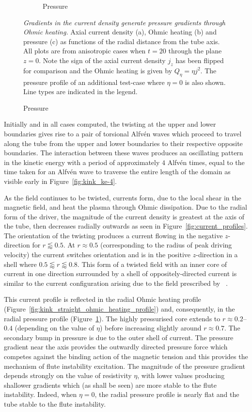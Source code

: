 \documentclass[fleqn,usenatbib]{mnras}
\newcommand{\revcite}[1]{{\color{red} \underline{#1}}}
\newcommand{\mycaption}[2]{\caption[#1]{\emph{#1} #2}}
\begin{document}
\begin{figure}
\begin{subfigure}{0.32\textwidth}
      \caption{Pressure}
      \label{fig:pressure_profiles}
    \end{subfigure}
  \mycaption{ Gradients in the current density generate pressure gradients
  through Ohmic heating.}{Axial current density (a), Ohmic heating (b) and
  pressure (c) as functions of the radial distance from the tube axis. All
  plots are from anisotropic cases when $t=20$ through the plane $z=0$. Note
  the sign of the axial current density $j_z$ has been flipped for comparison
  and the Ohmic heating is given by $Q_{\eta} = \eta j^2$. The pressure profile
  of an additional test-case where $\eta=0$ is also shown. Line types are
  indicated in the legend.}
  \label{fig:pressure_and_heating}
\end{figure}

Initially and in all cases computed, the twisting at the upper and lower
boundaries gives rise to a pair of torsional Alfv\'en waves which proceed to
travel along the tube from the upper and lower boundaries to their respective
opposite boundaries. The interaction between these waves produces an
oscillating pattern in the kinetic energy with a period of approximately $4$
Alfv\'en times, equal to the time taken for an Alfv\'en wave to traverse the
entire length of the domain as visible early in Figure~\ref{fig:kink_ke-4}. 

As the field continues to be twisted, currents form, due to the local shear in
the magnetic field, and heat the plasma through Ohmic dissipation. Due to the
radial form of the driver, the magnitude of the current density is greatest at
the axis of the tube, then decreases radially outwards as seen in
Figure~\ref{fig:current_profiles}. The orientation of the twisting produces
a current flowing in the negative $z$-direction for $r\lessapprox0.5$. At $r
\approx 0.5$ (corresponding to the radius of peak driving velocity) the current
switches orientation and is in the positive $z$-direction in a shell where
$0.5\lessapprox r \lessapprox 0.8$. This form of a twisted field with an inner
core of current in one direction surrounded by a shell of oppositely-directed
current is similar to the current configuration arising due to the field
prescribed by~\revcite{\citet{quinnEffectAnisotropicViscosity2020}}. 

This current profile is reflected in the radial Ohmic heating profile
(Figure~\ref{fig:kink_straight_ohmic_heating_profile}) and, consequently, in
the radial pressure profile (Figure~\ref{fig:pressure_profiles}). The highly
pressurised core extends to $r\approx 0.2$--$0.4$ (depending on the value of
$\eta$) before increasing slightly around $r\approx 0.7$. The secondary bump in
pressure is due to the outer shell of current. The pressure gradient near the
axis provides the outwardly directed pressure force which competes against the
binding action of the magnetic tension and this provides the mechanism of flute
instability excitation.  The magnitude of the pressure gradient depends
strongly on the value of resistivity $\eta$, with lower values producing
shallower gradients which (as shall be seen) are more stable to the flute
instability. Indeed, when $\eta=0$, the radial pressure profile is nearly flat
and the tube stable to the flute instability.
\end{document}

